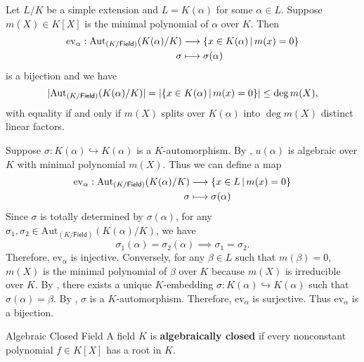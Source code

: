 \begin{corollary}{}{}
    Let $L/K$ be a simple extension and $L=K(\alpha)$ for some $\alpha\in L$. Suppose $m(X)\in K[X]$ is the minimal polynomial of $\alpha$ over $K$. Then 
    \begin{align*}
        \mathrm{ev}_{\alpha}:\mathrm{Aut}_{(K/\mathsf{Field})}(K(\alpha)/K)&\longrightarrow \left\{ x\in K(\alpha)\,\middle\vert\, m(x)=0\right\}\\
        \sigma&\longmapsto \sigma(\alpha)
    \end{align*}
    is a bijection and we have
    \[
    |\mathrm{Aut}_{(K/\mathsf{Field})}(K(\alpha)/K)|=\left|\left\{ x\in K(\alpha)\,\middle\vert\, m(x)=0\right\}\right|\le \deg m(X),
    \]
    with equality if and only if $m(X)$ splits over $K(\alpha)$ into $\deg m(X)$ distinct linear factors.
\end{corollary}
\begin{prf}
    Suppose $\sigma:K(\alpha)\hookrightarrow K(\alpha)$ is a $K$-automorphism. By , $u(\alpha)$ is algebraic over $K$ with minimal polynomial $m(X)$. Thus we can define a map
    \begin{align*}
        \mathrm{ev}_{\alpha}:\mathrm{Aut}_{(K/\mathsf{Field})}(K(\alpha)/K)&\longrightarrow \left\{ x\in L\,\middle\vert\, m(x)=0\right\}\\
        \sigma&\longmapsto \sigma(\alpha)
    \end{align*}
    Since $\sigma$ is totally determined by $\sigma(\alpha)$, for any $\sigma_1, \sigma_2\in \mathrm{Aut}_{(K/\mathsf{Field})}(K(\alpha)/K)$, we have 
    \[
    \sigma_1(\alpha)=\sigma_2(\alpha)\implies \sigma_1=\sigma_2.
    \]
    Therefore, $\mathrm{ev}_{\alpha}$ is injective. Conversely, for any $\beta\in L$ such that $m(\beta)=0$, $m(X)$ is the minimal polynomial of $\beta$ over $K$ because $m(X)$ is irreducible over $K$. By , there exists a unique $K$-embedding $\sigma:K(\alpha)\hookrightarrow K(\alpha)$ such that $\sigma(\alpha)=\beta$. By , $\sigma$ is a $K$-automorphism. Therefore, $\mathrm{ev}_{\alpha}$ is surjective. Thus $\mathrm{ev}_{\alpha}$ is a bijection.
\end{prf}

\begin{definition}{Algebraic Closed Field}{}
    A field $K$ is \textbf{algebraically closed} if every nonconstant polynomial $f\in K[X]$ has a root in $K$.
\end{definition}

